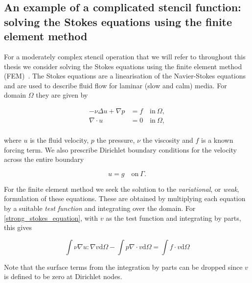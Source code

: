\documentclass[thesis]{subfiles}
\begin{document}

\subsection{An example of a complicated stencil function: solving the Stokes equations using the finite element method}

For a moderately complex stencil operation that we will refer to throughout this thesis we consider solving the Stokes equations using the finite element method (FEM)~\parencite{larsonFiniteElementMethod2013}.
The Stokes equations are a linearisation of the Navier-Stokes equations and are used to describe fluid flow for laminar (slow and calm) media.
For domain $\Omega$ they are given by

\begin{align}
  \label{strong_stokes_equation}
  - \nu \Delta u + \nabla p &= f \quad \textrm{in} \ \Omega, \\
  \nabla \cdot u &= 0 \quad \textrm{in} \ \Omega, \\
\end{align}

where $u$ is the fluid velocity, $p$ the pressure, $\nu$ the viscosity and $f$ is a known forcing term.
We also prescribe Dirichlet boundary conditions for the velocity across the entire boundary

\begin{equation}
  \label{strong_stokes_equation_bc}
  u = g \quad \textrm{on} \ \Gamma. 
\end{equation}

For the finite element method we seek the solution to the \textit{variational}, or \textit{weak}, formulation of these equations.
These are obtained by multiplying each equation by a suitable \textit{test function} and integrating over the domain.
For \ref{strong_stokes_equation}, with $v$ as the test function and integrating by parts, this gives

\begin{equation}
  \int \nu \nabla u : \nabla v \textrm{d}\Omega
  - \int p \nabla \cdot v \textrm{d}\Omega
  = \int f \cdot v \textrm{d}\Omega
\end{equation}

Note that the surface terms from the integration by parts can be dropped since $v$ is defined to be zero at Dirichlet nodes.
\end{document}
